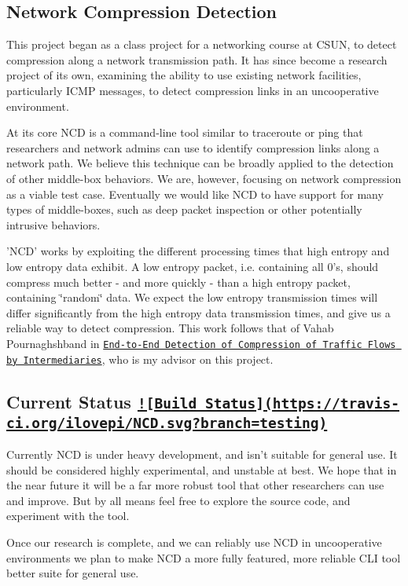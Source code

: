 \subsection*{Network Compression Detection }

This project began as a class project for a networking course at C\+S\+U\+N, to detect compression along a network transmission path. It has since become a research project of its own, examining the ability to use existing network facilities, particularly I\+C\+M\+P messages, to detect compression links in an uncooperative environment.

At its core {\ttfamily N\+C\+D} is a command-\/line tool similar to {\ttfamily traceroute} or {\ttfamily ping} that researchers and network admins can use to identify compression links along a network path. We believe this technique can be broadly applied to the detection of other middle-\/box behaviors. We are, however, focusing on network compression as a viable test case. Eventually we would like N\+C\+D to have support for many types of middle-\/boxes, such as deep packet inspection or other potentially intrusive behaviors.

'N\+C\+D' works by exploiting the different processing times that high entropy and low entropy data exhibit. A low entropy packet, i.\+e. containing all 0's, should compress much better -\/ and more quickly -\/ than a high entropy packet, containing \char`\"{}random\char`\"{} data. We expect the low entropy transmission times will differ significantly from the high entropy data transmission times, and give us a reliable way to detect compression. This work follows that of Vahab Pournaghshband in \href{http://lasr.cs.ucla.edu/vahab/resources/compression_detection.pdf}{\tt End-\/to-\/\+End Detection of Compression of Traffic Flows by Intermediaries}, who is my advisor on this project.

\subsection*{Current Status \href{https://travis-ci.org/ilovepi/NCD}{\tt !\mbox{[}Build Status\mbox{]}(https\+://travis-\/ci.\+org/ilovepi/\+N\+C\+D.\+svg?branch=testing)} }

Currently {\ttfamily N\+C\+D} is under heavy development, and isn't suitable for general use. It should be considered highly experimental, and unstable at best. We hope that in the near future it will be a far more robust tool that other researchers can use and improve. But by all means feel free to explore the source code, and experiment with the tool.

Once our research is complete, and we can reliably use {\ttfamily N\+C\+D} in uncooperative environments we plan to make {\ttfamily N\+C\+D} a more fully featured, more reliable C\+L\+I tool better suite for general use. 